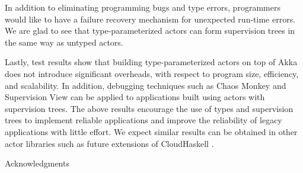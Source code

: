 \documentclass[preprint, authoryear, 10 pt]{sigplanconf}
\begin{document}
In addition to eliminating programming bugs and type errors, 
programmers would like to have a failure recovery mechanism for
unexpected run-time errors.  We are glad to see that type-parameterized 
actors can form supervision trees in the same way as untyped actors.

Lastly, test results show that building type-parameterized actors on top of 
Akka does not introduce significant overheads, with respect to program size,
efficiency, and scalability.  In addition, debugging techniques such 
as Chaos Monkey and Supervision View can be applied to applications built 
using actors with supervision trees.  The above results encourage the use of 
types and supervision trees to implement reliable applications and improve the 
reliability of legacy applications with little effort.  We expect similar 
results can be obtained in other actor libraries such as future extensions 
of CloudHaskell \cite{OTPCloudHaskell}.

\acks
Acknowledgments





\appendix
%  

\end{document}
